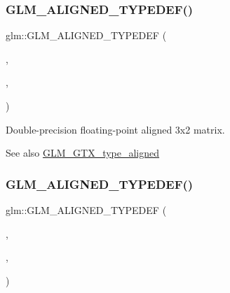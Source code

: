 \subsubsection{\texorpdfstring{G\+L\+M\+\_\+\+A\+L\+I\+G\+N\+E\+D\+\_\+\+T\+Y\+P\+E\+D\+E\+F()}{GLM\_ALIGNED\_TYPEDEF()}\hspace{0.1cm}{\footnotesize\ttfamily [199/209]}}
{\footnotesize\ttfamily glm\+::\+G\+L\+M\+\_\+\+A\+L\+I\+G\+N\+E\+D\+\_\+\+T\+Y\+P\+E\+D\+EF (\begin{DoxyParamCaption}\item[{\hyperlink{group__gtc__type__precision_ga0039ae03558b5242466f4c344c3c7d65}{f64mat3x2}}]{,  }\item[{aligned\+\_\+f64mat3x2}]{,  }\item[{32}]{ }\end{DoxyParamCaption})}

Double-\/precision floating-\/point aligned 3x2 matrix. \begin{DoxySeeAlso}{See also}
\hyperlink{group__gtx__type__aligned}{G\+L\+M\+\_\+\+G\+T\+X\+\_\+type\+\_\+aligned} 
\end{DoxySeeAlso}
\mbox{\label{group__gtx__type__aligned_gad1dda32ed09f94bfcf0a7d8edfb6cf13}} 
\subsubsection{\texorpdfstring{G\+L\+M\+\_\+\+A\+L\+I\+G\+N\+E\+D\+\_\+\+T\+Y\+P\+E\+D\+E\+F()}{GLM\_ALIGNED\_TYPEDEF()}\hspace{0.1cm}{\footnotesize\ttfamily [200/209]}}
{\footnotesize\ttfamily glm\+::\+G\+L\+M\+\_\+\+A\+L\+I\+G\+N\+E\+D\+\_\+\+T\+Y\+P\+E\+D\+EF (\begin{DoxyParamCaption}\item[{\hyperlink{group__gtc__type__precision_gab272e67eb87cc1e8233237480c2aa8d2}{f64mat3x3}}]{,  }\item[{aligned\+\_\+f64mat3x3}]{,  }\item[{32}]{ }\end{DoxyParamCaption})}

